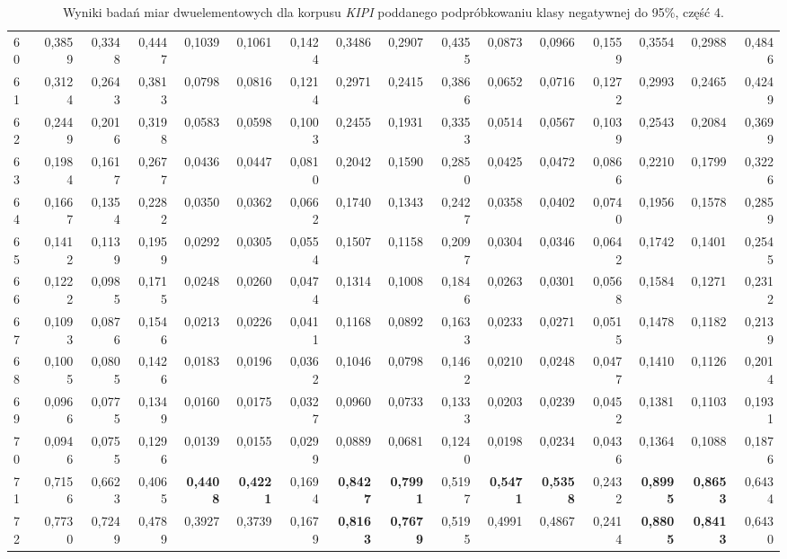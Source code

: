 \begin{table}[htp!]
\begin{adjustwidth}{-2cm}{}
\begin{tabular}{ l | *{15}{| r}}
60	&	0,3859	&	0,3348	&	0,4447	&	0,1039	&	0,1061	&	0,1424	&	0,3486	&	0,2907	&	0,4355	&	0,0873	&	0,0966	&	0,1559	&	0,3554	&	0,2988	&	0,4846	\\
61	&	0,3124	&	0,2643	&	0,3813	&	0,0798	&	0,0816	&	0,1214	&	0,2971	&	0,2415	&	0,3866	&	0,0652	&	0,0716	&	0,1272	&	0,2993	&	0,2465	&	0,4249	\\
62	&	0,2449	&	0,2016	&	0,3198	&	0,0583	&	0,0598	&	0,1003	&	0,2455	&	0,1931	&	0,3353	&	0,0514	&	0,0567	&	0,1039	&	0,2543	&	0,2084	&	0,3699	\\
63	&	0,1984	&	0,1617	&	0,2677	&	0,0436	&	0,0447	&	0,0810	&	0,2042	&	0,1590	&	0,2850	&	0,0425	&	0,0472	&	0,0866	&	0,2210	&	0,1799	&	0,3226	\\
64	&	0,1667	&	0,1354	&	0,2282	&	0,0350	&	0,0362	&	0,0662	&	0,1740	&	0,1343	&	0,2427	&	0,0358	&	0,0402	&	0,0740	&	0,1956	&	0,1578	&	0,2859	\\
65	&	0,1412	&	0,1139	&	0,1959	&	0,0292	&	0,0305	&	0,0554	&	0,1507	&	0,1158	&	0,2097	&	0,0304	&	0,0346	&	0,0642	&	0,1742	&	0,1401	&	0,2545	\\
66	&	0,1222	&	0,0985	&	0,1715	&	0,0248	&	0,0260	&	0,0474	&	0,1314	&	0,1008	&	0,1846	&	0,0263	&	0,0301	&	0,0568	&	0,1584	&	0,1271	&	0,2312	\\
67	&	0,1093	&	0,0876	&	0,1546	&	0,0213	&	0,0226	&	0,0411	&	0,1168	&	0,0892	&	0,1633	&	0,0233	&	0,0271	&	0,0515	&	0,1478	&	0,1182	&	0,2139	\\
68	&	0,1005	&	0,0805	&	0,1426	&	0,0183	&	0,0196	&	0,0362	&	0,1046	&	0,0798	&	0,1462	&	0,0210	&	0,0248	&	0,0477	&	0,1410	&	0,1126	&	0,2014	\\
69	&	0,0966	&	0,0775	&	0,1349	&	0,0160	&	0,0175	&	0,0327	&	0,0960	&	0,0733	&	0,1333	&	0,0203	&	0,0239	&	0,0452	&	0,1381	&	0,1103	&	0,1931	\\
70	&	0,0946	&	0,0755	&	0,1296	&	0,0139	&	0,0155	&	0,0299	&	0,0889	&	0,0681	&	0,1240	&	0,0198	&	0,0234	&	0,0436	&	0,1364	&	0,1088	&	0,1876	\\
71	&	0,7156	&	0,6623	&	0,4065	&	\textbf{0,4408}	&	\textbf{0,4221}	&	0,1694	&	\textbf{0,8427}	&	\textbf{0,7991}	&	0,5197	&	\textbf{0,5471}	&	\textbf{0,5358}	&	0,2432	&	\textbf{0,8995}	&	\textbf{0,8653}	&	0,6434	\\
72	&	0,7730	&	0,7249	&	0,4789	&	0,3927	&	0,3739	&	0,1679	&	\textbf{0,8163}	&	\textbf{0,7679}	&	0,5195	&	0,4991	&	0,4867	&	0,2414	&	\textbf{0,8805}	&	\textbf{0,8413}	&	0,6430	\\
	\bottomrule
\end{tabular}
 \end{adjustwidth}
\caption[Wyniki badań miar dwuelementowych dla korpusu \emph{KIPI} poddanego podpróbkowaniu klasy negatywnej do 95\%, część 4]{Wyniki badań miar dwuelementowych dla korpusu \emph{KIPI} poddanego podpróbkowaniu klasy negatywnej do 95\%, część 4.}
\label{KIPI_subsampled_5_part_4}
\end{table}

